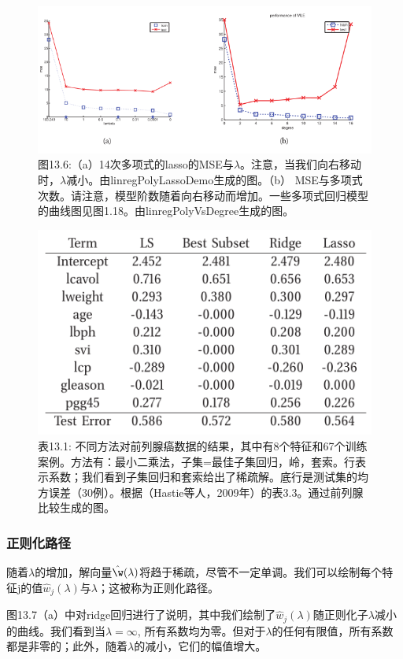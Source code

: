 \documentclass[a4paper]{article}
\begin{document}
\begin{figure}[h]
	\centering
	\includegraphics[width=0.7\linewidth]{fig13/figure6}
	\caption*{图13.6:（a）14次多项式的lasso的MSE与$\lambda$。注意，当我们向右移动时，$\lambda$减小。由linregPolyLassoDemo生成的图。（b） MSE与多项式次数。请注意，模型阶数随着向右移动而增加。一些多项式回归模型的曲线图见图1.18。由linregPolyVsDegree生成的图。}
\end{figure}

\begin{figure}[h]
	\centering
	\includegraphics[width=0.7\linewidth]{fig13/table1}
	\caption*{表13.1: 不同方法对前列腺癌数据的结果，其中有8个特征和67个训练案例。方法有：最小二乘法，子集=最佳子集回归，岭，套索。行表示系数；我们看到子集回归和套索给出了稀疏解。底行是测试集的均方误差（30例）。根据（Hastie等人，2009年）的表3.3。通过前列腺比较生成的图。}
\end{figure}

\subsubsection{正则化路径}
随着$\lambda$的增加，解向量$\hat{\w}(\lambda)$将趋于稀疏，尽管不一定单调。我们可以绘制每个特征j的值$\hat{w}_j(\lambda)$与$\lambda$；这被称为正则化路径。

图13.7（a）中对ridge回归进行了说明，其中我们绘制了$\hat{w}_j(\lambda)$随正则化子$\lambda$减小的曲线。我们看到当$\lambda=\infty$, 所有系数均为零。但对于$\lambda$的任何有限值，所有系数都是非零的；此外，随着$\lambda$的减小，它们的幅值增大。
\end{document}
